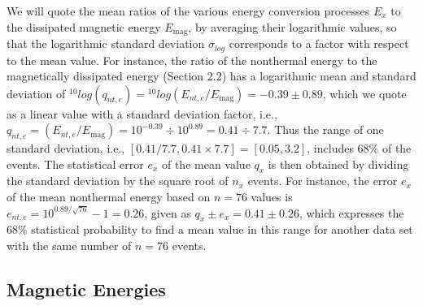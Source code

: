 \documentclass[10pt,preprint]{aastex}  %
\begin{document}
We will quote the mean ratios of the various energy conversion
processes $E_x$ to the dissipated magnetic energy $E_{\mathrm{mag}}$,
by averaging their logarithmic values, so that the logarithmic
standard deviation $\sigma_{log}$ corresponds to a factor with respect 
to the mean value. For instance, the ratio of the nonthermal
energy to the magnetically dissipated energy (Section 2.2)
has a logarithmic mean and standard deviation of ${}^{10}log(q_{nt,e})
= {}^{10}log{(E_{nt,e}/E_{\mathrm{mag}})} = -0.39 \pm 0.89$,
which we quote as a linear value with a standard deviation
factor, i.e., 
$q_{nt,e}= (E_{nt,e}/E_{\mathrm{mag}}) = 10^{-0.39} \div 10^{0.89}
= 0.41 \div 7.7$. Thus the range of one standard deviation,
i.e., $[0.41/7.7, 0.41 \times 7.7] = [0.05, 3.2]$, includes
68\% of the events. The statistical error $e_x$ of the mean value 
$q_x$ is then obtained by dividing the standard deviation by the
square root of $n_x$ events. For instance, the error $e_x$ of 
the mean nonthermal energy based on $n=76$ values is 
$e_{nt,e}=10^{0.89/\sqrt{76}} - 1 = 0.26$, given as
$q_x \pm e_x = 0.41\pm0.26$, which expresses the 68\%
statistical probability to find a mean value in this range
for another data set with the same number of $n=76$ events.

\subsection{		Magnetic Energies			}
\end{document}
